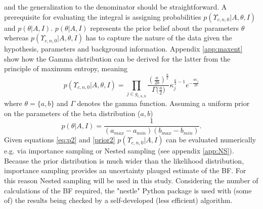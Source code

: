 \documentclass[fleqn,usenatbib,nofootinbib]{revtex4-2}
\begin{document}
	and the generalization to the denominator should be straightforward. A prerequisite for evaluating the integral is assigning probabilities $p(\Upsilon_{c,n,0}|A,\theta,I)$ and $p(\theta|A,I)$. $p(\theta|A,I)$ represents the prior belief about the parameters $\theta$ whereas $p(\Upsilon_{c,n,0}|A,\theta,I)$ has to capture the nature of the data given the hypothesis, parameters and background information. Appendix \ref{app:maxent} show how the Gamma distribution can be derived for the latter from the principle of maximum entropy, meaning
	\begin{equation}
		p(\Upsilon_{c,n,0}|A,\theta,I) = \prod_{j\in g_{c,n,0}}\frac{(\frac{a}{2b})^{\frac{a}{2}}}{\Gamma\big(\frac{a}{2}\big)}\kappa_j^{\frac{a}{2}-1}e^{-\frac{a\kappa_j}{2b}}
		\label{eq:p2}
	\end{equation}
	where $\theta =\{a,b\}$ and $\Gamma$ denotes the gamma function. Assuming a uniform prior on the parameters of the beta distribution ($a,b$)
	\begin{equation}
		p(\theta|A,I) = \frac{1}{(a_{max}-a_{min})(b_{max}-b_{min})}.
		\label{prior2}
	\end{equation}
	Given equations \eqref{eq:p2} and \eqref{prior2} $p(\Upsilon_{c,n,0}|A,I)$ can be evaluated numerically e.g. via importance sampling or Nested sampling (see appendix \ref{app:NS}). Because the prior distribution is much wider than the likelihood distribution, importance sampling provides an uncertainty plauged estimate of the BF. For this reason Nested sampling will be used in this study. Considering the number of calculations of the BF required, the "nestle" Python package is used with (some of) the results being checked by a self-developed (less efficient) algorithm.
	
\end{document}
